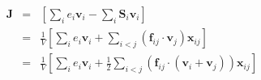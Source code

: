 \documentclass[12pt]{article}
\begin{document}
\begin{eqnarray*}
\mathbf{J} & = & \left[ \sum_i e_i \mathbf{v}_i - \sum_{i} \mathbf{S}_{i} \mathbf{v}_i \right] \\
& = & \frac{1}{V} \left[ \sum_i e_i \mathbf{v}_i + \sum_{i<j} \left( \mathbf{f}_{ij} \cdot \mathbf{v}_j \right) \mathbf{x}_{ij} \right] \\
& = & \frac{1}{V} \left[ \sum_i e_i \mathbf{v}_i + \frac{1}{2} \sum_{i<j} \left( \mathbf{f}_{ij} \cdot \left(\mathbf{v}_i + \mathbf{v}_j \right)  \right) \mathbf{x}_{ij} \right]
\end{eqnarray*}
\end{document}

